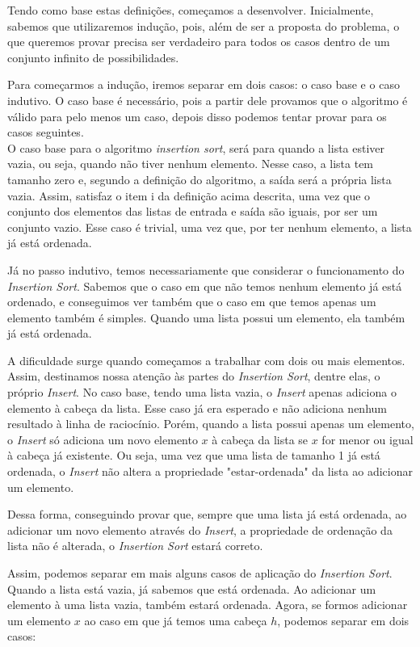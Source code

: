 \documentclass[a4paper, 10pt]{article}
\begin{document}
Tendo como base estas definições, começamos a desenvolver. Inicialmente, sabemos que utilizaremos indução, pois, além de ser a proposta do problema, o que queremos provar precisa ser verdadeiro para todos os casos
dentro de um conjunto infinito de possibilidades.
	
Para começarmos a indução, iremos separar em dois casos: o caso base e o caso indutivo. O caso base é necessário, pois a partir dele provamos que o algoritmo é válido para pelo menos um caso, depois disso podemos tentar provar para os casos seguintes.\\

O caso base para o algoritmo \textit{insertion sort}, será para quando a lista estiver vazia, ou seja, quando não tiver nenhum elemento. Nesse caso, a lista tem tamanho zero e, segundo a definição do algoritmo, a saída será a própria lista vazia. Assim, satisfaz o item i da definição acima descrita, uma vez que o conjunto dos elementos das listas de entrada e saída são iguais, por ser um conjunto vazio. Esse caso é trivial, uma vez que, por ter nenhum elemento, a lista já está ordenada.

Já no passo indutivo, temos necessariamente que considerar o funcionamento do \textit{Insertion Sort}. Sabemos que o caso em que não temos nenhum elemento já está ordenado, e conseguimos ver também que o caso em que temos apenas um elemento também é simples. Quando uma lista possui um elemento, ela também já está ordenada.

A dificuldade surge quando começamos a trabalhar com dois ou mais elementos. Assim, destinamos nossa atenção às partes do \textit{Insertion Sort}, dentre elas, o próprio \textit{Insert}.
No caso base, tendo uma lista vazia, o \textit{Insert} apenas adiciona o elemento à cabeça da lista. Esse caso já era esperado e não adiciona nenhum resultado à linha de raciocínio. Porém, quando a lista possui apenas um elemento, o \textit{Insert} só adiciona um novo elemento $x$ à cabeça da lista se $x$ for menor ou igual à cabeça já existente. Ou seja, uma vez que uma lista de tamanho 1 já está ordenada, o \textit{Insert} não altera a propriedade "estar-ordenada" da lista ao adicionar um elemento.

Dessa forma, conseguindo provar que, sempre que uma lista já está ordenada, ao adicionar um novo elemento através do \textit{Insert}, a propriedade de ordenação da lista não é alterada, o \textit{Insertion Sort} estará correto.

Assim, podemos separar em mais alguns casos de aplicação do \textit{Insertion Sort}. Quando a lista está vazia, já sabemos que está ordenada. Ao adicionar um elemento à uma lista vazia, também estará ordenada. Agora, se formos adicionar um elemento $x$ ao caso em que já temos uma cabeça $h$, podemos separar em dois casos:
\end{document}
